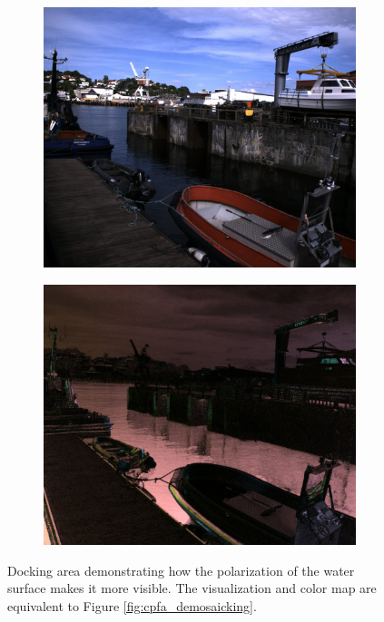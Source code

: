 \vspace{-.5cm}

\begin{figure}[H]
    \begin{subfigure}[T]{.49\textwidth}
        \includegraphics[width=\textwidth]{figures/pictures/img_2790_s0.jpg}
    \end{subfigure} \hfill
    \begin{subfigure}[T]{.49\textwidth}
        \includegraphics[width=\textwidth]{figures/pictures/img_2790_pol.jpg}
    \end{subfigure}
    \caption{Docking area demonstrating how the polarization of the water surface makes it more visible. 
    The visualization and color map are equivalent to Figure \ref{fig:cpfa_demosaicking}.}
\end{figure}
\vspace{-.7cm}

